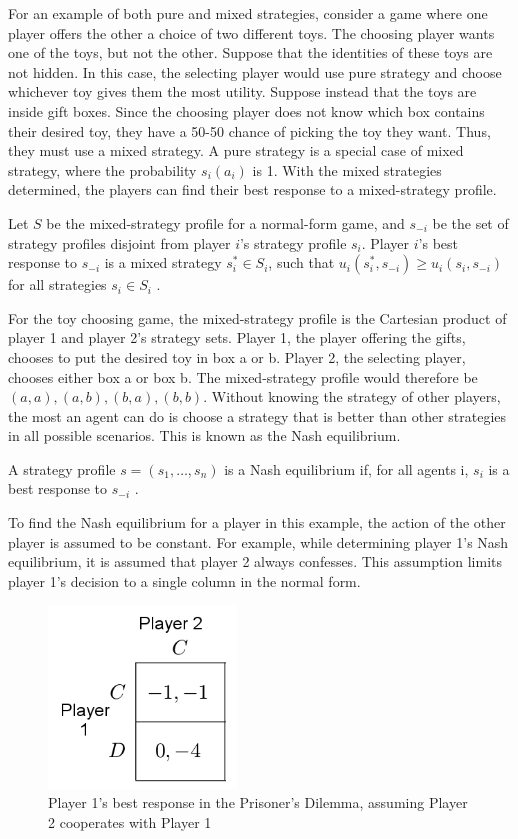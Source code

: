 For an example of both pure and mixed strategies, consider a game where one player offers the other a choice of two different toys. The choosing player wants one of the toys, but not the other. Suppose that the identities of these toys are not hidden. In this case, the selecting player would use pure strategy and choose whichever toy gives them the most utility. Suppose instead that the toys are inside gift boxes. Since the choosing player does not know which box contains their desired toy, they have a 50-50 chance of picking the toy they want. Thus, they must use a mixed strategy. A pure strategy is a special case of mixed strategy, where the probability $s_i(a_i)$ is 1. With the mixed strategies determined, the players can find their best response to a mixed-strategy profile.

\begin{define}
  Let $S$ be the mixed-strategy profile for a normal-form game, and $s_{-i}$ be the set of strategy profiles disjoint from player $i$'s strategy profile $s_i$. Player $i$'s best response to $s_{-i}$ is a mixed strategy $s_i^*\in S_i$, such that $u_i(s_i^*,s_{-i}) \ge u_i(s_i, s_{-i})$ for all strategies $s_i\in S_i$ \cite{shoh09}.
\end{define}

For the toy choosing game, the mixed-strategy profile is the Cartesian product of player 1 and player 2's strategy sets. Player 1, the player offering the gifts, chooses to put the desired toy in box a or b. Player 2, the selecting player, chooses either box a or box b. The mixed-strategy profile would therefore be $(a, a), (a, b), (b, a), (b, b)$. Without knowing the strategy of other players, the most an agent can do is choose a strategy that is better than other strategies in all possible scenarios. This is known as the Nash equilibrium.

\begin{define}
  A strategy profile $s=(s_1,\dots ,s_n)$ is a Nash equilibrium if, for all agents i, $s_i$ is a best response to $s_{-i}$ \cite{shoh09}.
\end{define}

To find the Nash equilibrium for a player in this example, the action of the other player is assumed to be constant. For example, while determining player 1's Nash equilibrium, it is assumed that player 2 always confesses. This assumption limits player 1's decision to a single column in the normal form.
\begin{figure}[H]
  \centering
  \includegraphics[width=5cm]{figures/ExamplePartialGrid1.png}
  \caption{Player 1's best response in the Prisoner's Dilemma, assuming Player 2 cooperates with Player 1}
  \label{fig:NashCol1}
\end{figure}

